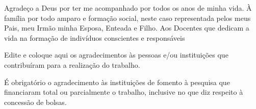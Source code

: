 
\begin{agradecimentos}[AGRADECIMENTOS]

    Agradeço a Deus por ter me acompanhado por todos os anos de minha vida. 
    À família por todo amparo e formação social, neste caso representada pelos meus Pais, meu Irmão minha Esposa, Enteada e Filho. 
    Aos Docentes que dedicam a vida na formação de indivíduos conscientes e responsáveis

Edite e coloque aqui os agradecimentos às pessoas e/ou instituições que contribuíram para a realização do trabalho.

É obrigatório o agradecimento às instituições de fomento à pesquisa que financiaram total ou parcialmente o trabalho, inclusive no que diz respeito à concessão de bolsas.

\end{agradecimentos}
